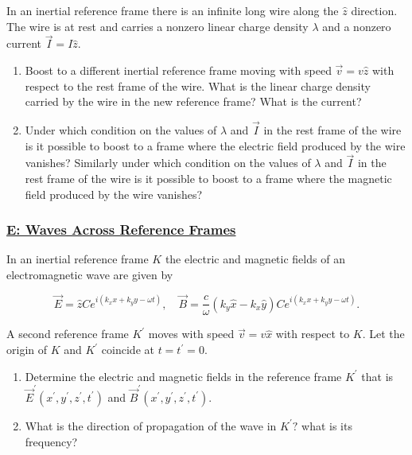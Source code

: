 In an inertial reference frame there is an infinite long wire along the $\hat{z}$ direction. The wire is at rest and carries a nonzero linear charge density $\lambda$ and a nonzero current $\vec{I}=I \hat{z}$.
\begin{enumerate}
	\item Boost to a different inertial reference frame moving with speed $\vec{v}=v \hat{z}$ with respect to
	the rest frame of the wire. What is the linear charge density carried by the wire in the new reference frame? What is the current?
	\item Under which condition on the values of $\lambda$ and $\vec{I}$ in the rest frame of the wire is it
	possible to boost to a frame where the electric field produced by the wire vanishes? Similarly under which condition on the values of $\lambda$ and $\vec{I}$ in the rest frame of the wire is it possible to boost to a frame where the magnetic field produced by the wire vanishes?
\end{enumerate}

\subsubsection{\hyperref[E: Waves Across Reference Frames]{E: Waves Across Reference Frames}}

In an inertial reference frame $K$ the electric and magnetic fields of an electromagnetic wave are given by

\begin{equation}
	\vec{E}=\hat{z} C e^{i\left(k_{x} x+k_{y} y-\omega t\right)}, \quad \vec{B}=\frac{c}{\omega}\left(k_{y} \hat{x}-k_{x} \hat{y}\right) C e^{i\left(k_{x} x+k_{y} y-\omega t\right)}.
\end{equation}

A second reference frame $K^{\prime}$ moves with speed $\vec{v}=v \hat{x}$ with respect to $K .$ Let the origin of
$K$ and $K^{\prime}$ coincide at $t=t^{\prime}=0$.

\begin{enumerate}
	\item Determine the electric and magnetic fields in the reference frame $K^{\prime}$ that is $\vec{E}^{\prime}\left(x^{\prime}, y^{\prime}, z^{\prime}, t^{\prime}\right)$ and $\vec{B}^{\prime}\left(x^{\prime}, y^{\prime}, z^{\prime}, t^{\prime}\right)$.
	\item What is the direction of propagation of the wave in $K^{\prime} ?$ what is its frequency?
\end{enumerate}



